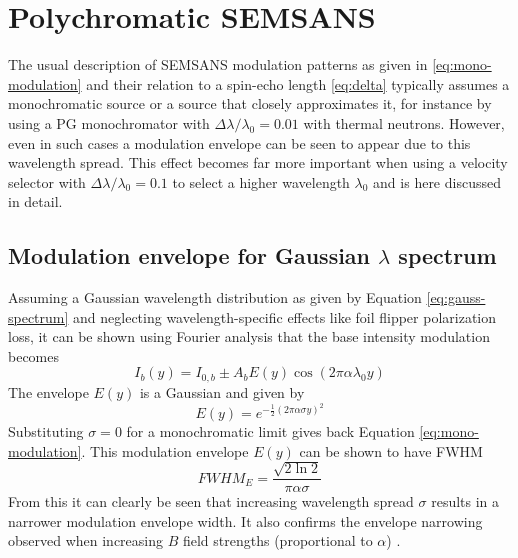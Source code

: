 \section{Polychromatic SEMSANS}
\label{c3.6}
The usual description of SEMSANS modulation patterns as given in \eqref{eq:mono-modulation} and their relation to a spin-echo length \eqref{eq:delta} typically assumes a monochromatic source or a source that closely approximates it, for instance by using a PG monochromator with $\Delta\lambda/\lambda_0 = 0.01$ with thermal neutrons. However, even in such cases a modulation envelope can be seen to appear \cite{bouwman2021} due to this wavelength spread. This effect becomes far more important when using a velocity selector with $\Delta\lambda/\lambda_0 = 0.1$ to select a higher wavelength $\lambda_0$ and is here discussed in detail.
\subsection{Modulation envelope for Gaussian $\lambda$ spectrum}
Assuming a Gaussian wavelength distribution as given by Equation \eqref{eq:gauss-spectrum} and neglecting wavelength-specific effects like foil flipper polarization loss, it can be shown using Fourier analysis that the base intensity modulation becomes
\begin{equation}
	I_b(y) = I_{0,b} \pm A_bE(y)\cos(2\pi\alpha\lambda_0y) \label{eq:poly-base-modulation}
\end{equation}
The envelope $E(y)$ is a Gaussian and given by
\begin{equation}
	E(y) = e^{-\frac{1}{2}\left(2\pi\alpha\sigma y\right)^2} \label{eq:poly-base-modulation-env}
\end{equation}
Substituting $\sigma=0$ for a monochromatic limit gives back Equation \eqref{eq:mono-modulation}. This modulation envelope $E(y)$ can be shown to have FWHM 
\begin{equation}
	FWHM_E = \frac{\sqrt{2\ln 2}}{\pi\alpha\sigma} \label{eq:poly-base-modulation-fwhm}
\end{equation}
From this it can clearly be seen that increasing wavelength spread $\sigma$ results in a narrower modulation envelope width. It also confirms the envelope narrowing observed when increasing $B$ field strengths (proportional to $\alpha$) \cite{bouwman2021}. 
